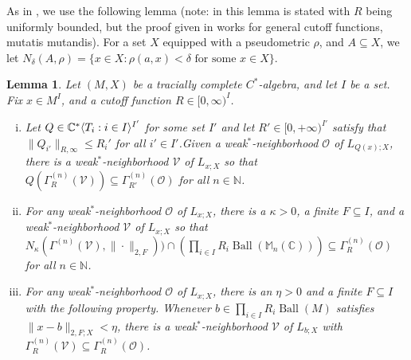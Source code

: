 \documentclass[10pt]{amsart}
\newtheorem{lem}[thm]{Lemma}
\theoremstyle{definition}
\numberwithin{equation}{section}
\newcommand{\bC}{{\mathbb C}}
\newcommand{\bM}{{\mathbb M}}
\newcommand{\bN}{{\mathbb N}}
\DeclareMathOperator{\Ball}{Ball}
\DeclarePairedDelimiter{\ip}{\langle}{\rangle}
\begin{document}
As in \cite{macmahon20261boundedentropycalgebras}, we use the following lemma (note: in \cite{macmahon20261boundedentropycalgebras} this lemma is stated with $R$ being uniformly bounded, but the proof given in \cite{macmahon20261boundedentropycalgebras} works for general cutoff functions, mutatis mutandis). For a set $X$ equipped with a pseudometric $\rho$, and $A\subseteq X$, we let $N_{\delta}(A,\rho)=\{x\in X:\rho(a,x)<\delta \text{ for some $x\in X$}\}$.


\begin{lem}\label{lem: key lem for invariance}
Let $(M,X)$ be a tracially complete $C^{*}$-algebra, and let $I$ be a set. Fix $x\in M^{I}$, and a cutoff function $R\in [0,\infty)^{I}$. 
\begin{enumerate}[(i)]
\item Let $Q\in \bC^{*}\ip{T_{i}:i\in I}^{I'}$ for some set $I'$ and let $R'\in [0,+\infty)^{I'}$ satisfy that $\|Q_{i'}\|_{R,\infty}\leq R_{i}'$ for all $i'\in I'$.Given a weak$^{*}$-neighborhood $\mathcal{O}$ of $L_{Q(x);X}$, there is a weak$^{*}$-neighborhood $\mathcal{V}$ of $L_{x;X}$ so that $Q(\Gamma^{(n)}_{R}(\mathcal{V}))\subseteq \Gamma^{(n)}_{R'}(\mathcal{O})$ for all $n\in \bN$. \label{item: pushforward neighborhods}
\item For any weak$^{*}$-neighborhood $\mathcal{O}$ of $L_{x;X}$, there is a $\kappa>0$, a finite $F\subseteq I$, and a weak$^{*}$-neighborhood $\mathcal{V}$ of $L_{x;X}$ so that $N_{\kappa}(\Gamma^{(n)}(\mathcal{V}),\|\cdot\|_{2,F}))\cap \left(\prod_{i\in I}R_{i}\Ball(\bM_{n}(\bC))\right)\subseteq \Gamma^{(n)}_{R}(\mathcal{O})$ for all $n\in \bN$. \label{item: small perturbation neighborhood}
\item For any weak$^{*}$-neighborhood $\mathcal{O}$ of $L_{x;X}$, there is an $\eta>0$ and a finite $F\subseteq I$ with the following property. Whenever $b\in \prod_{i\in I}R_{i}\Ball(M)$ satisfies $\|x-b\|_{2,F;X}<\eta$, there is a weak$^{*}$-neighborhood $\mathcal{V}$ of $L_{b;X}$ with $\Gamma^{(n)}_{R}(\mathcal{V})\subseteq \Gamma^{(n)}_{R}(\mathcal{O})$.  \label{item: small perturbation neighborhood 2}
\end{enumerate}
\end{lem}



\end{document}
